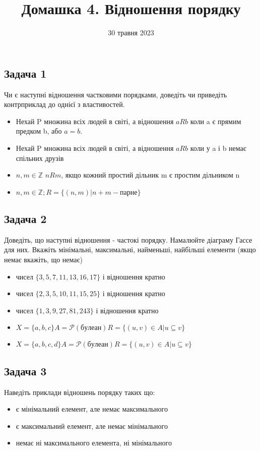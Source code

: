\documentclass{article}
\begin{document}
\title{Домашка 4. Відношення порядку}
\date{30 травня 2023}

\maketitle

\subsection*{Задача 1}
Чи є наступні відношення частковими порядками, доведіть чи приведіть контрприклад до однієї з властивостей.
\begin{itemize}
    \item Нехай P множина всіх людей в світі, а відношення $aRb$ коли a є прямим предком b, або $a=b$.
    \item Нехай P множина всіх людей в світі, а відношення $aRb$ коли у a і b немає спільних друзів
    \item $n,m \in \mathbb{Z}$ $nRm$, якщо кожний простий дільник m є простим дільником n
    \item $n,m \in \mathbb{Z}; R = \{(n,m)|n+m - парне \}$
\end{itemize}

\subsection*{Задача 2}
Доведіть, що наступні відношення - частокі порядку. Намалюйте діаграму Гассе для них. Вкажіть мінімальні, максимальні, найменьші, найбільші елементи (якщо немає вкажіть, що немає)
\begin{itemize}
    \item чисел $\{3, 5, 7, 11, 13, 16, 17\}$ і відношення кратно
    \item чисел $\{2, 3, 5, 10, 11, 15, 25\}$ і відношення кратно
    \item чисел $\{1, 3, 9, 27, 81, 243\}$ і відношення кратно
    \item $X=\{a,b,c\} A=\mathcal{P} (булеан)  R = \{(u,v) \in A| u \subseteq v\}$
    \item $X=\{a,b,c,d\} A=\mathcal{P} (булеан)  R = \{(u,v) \in A| u \subseteq v\}$
\end{itemize}

\subsection*{Задача 3}
Наведіть приклади відношень порядку таких що:
\begin{itemize}
    \item є мінімальний елемент, але немає максимального
    \item є максимальний елемент, але немає мінімального
    \item немає ні максимального елемента, ні мінімального
\end{itemize}
\end{document}
